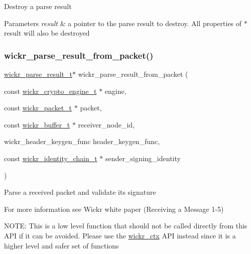 Destroy a parse result


\begin{DoxyParams}{Parameters}
{\em result} & a pointer to the parse result to destroy. All properties of \textquotesingle{}$\ast$result\textquotesingle{} will also be destroyed \\
\hline
\end{DoxyParams}
\mbox{\label{group__wickr__protocol_ga1654ef299f9189b27e5e58485f1ffcf5}} 
\subsubsection{\texorpdfstring{wickr\_parse\_result\_from\_packet()}{wickr\_parse\_result\_from\_packet()}}
{\footnotesize\ttfamily \mbox{\hyperlink{structwickr__parse__result}{wickr\+\_\+parse\+\_\+result\+\_\+t}}$\ast$ wickr\+\_\+parse\+\_\+result\+\_\+from\+\_\+packet (\begin{DoxyParamCaption}\item[{const \mbox{\hyperlink{structwickr__crypto__engine}{wickr\+\_\+crypto\+\_\+engine\+\_\+t}} $\ast$}]{engine,  }\item[{const \mbox{\hyperlink{structwickr__packet}{wickr\+\_\+packet\+\_\+t}} $\ast$}]{packet,  }\item[{const \mbox{\hyperlink{structwickr__buffer}{wickr\+\_\+buffer\+\_\+t}} $\ast$}]{receiver\+\_\+node\+\_\+id,  }\item[{wickr\+\_\+header\+\_\+keygen\+\_\+func}]{header\+\_\+keygen\+\_\+func,  }\item[{const \mbox{\hyperlink{structwickr__identity__chain}{wickr\+\_\+identity\+\_\+chain\+\_\+t}} $\ast$}]{sender\+\_\+signing\+\_\+identity }\end{DoxyParamCaption})}

Parse a received packet and validate it\textquotesingle{}s signature

For more information see Wickr white paper (Receiving a Message 1-\/5)

N\+O\+TE\+: This is a low level function that should not be called directly from this A\+PI if it can be avoided. Please use the \textquotesingle{}\mbox{\hyperlink{structwickr__ctx}{wickr\+\_\+ctx}}\textquotesingle{} A\+PI instead since it is a higher level and safer set of functions


